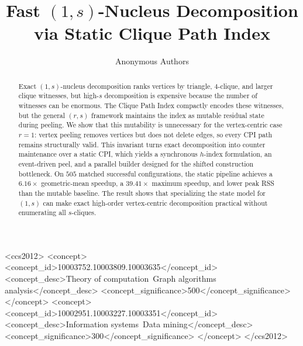 \documentclass[sigconf]{acmart}
\begin{document}
\title{Fast \texorpdfstring{\((1,s)\)}{(1,s)}-Nucleus Decomposition via Static Clique Path Index}

\author{Anonymous Authors}

\begin{abstract}
Exact \((1,s)\)-nucleus decomposition ranks vertices by triangle, \(4\)-clique, and larger clique witnesses, but high-\(s\) decomposition is expensive because the number of witnesses can be enormous.
%
The Clique Path Index compactly encodes these witnesses, but the general \((r,s)\) framework maintains the index as mutable residual state during peeling.
%
We show that this mutability is unnecessary for the vertex-centric case \(r=1\): vertex peeling removes vertices but does not delete edges, so every CPI path remains structurally valid.
%
This invariant turns exact decomposition into counter maintenance over a static CPI, which yields a synchronous \(h\)-index formulation, an event-driven peel, and a parallel builder designed for the shifted construction bottleneck.
%
On \(505\) matched successful configurations, the static pipeline achieves a \(6.16\times\) geometric-mean speedup, a \(39.41\times\) maximum speedup, and lower peak RSS than the mutable baseline.
%
The result shows that specializing the state model for \((1,s)\) can make exact high-order vertex-centric decomposition practical without enumerating all \(s\)-cliques.
\end{abstract}

\begin{CCSXML}
<ccs2012>
 <concept>
  <concept_id>10003752.10003809.10003635</concept_id>
  <concept_desc>Theory of computation~Graph algorithms analysis</concept_desc>
  <concept_significance>500</concept_significance>
 </concept>
 <concept>
  <concept_id>10002951.10003227.10003351</concept_id>
  <concept_desc>Information systems~Data mining</concept_desc>
  <concept_significance>300</concept_significance>
 </concept>
</ccs2012>
\end{CCSXML}



\maketitle














\end{document}
